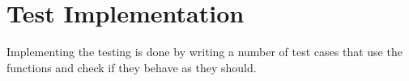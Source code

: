 \section{Test Implementation}
\label{sec:testimplementation}

Implementing the testing is done by writing a number of test cases that use the functions and check if they behave as they should.

